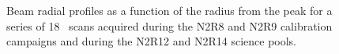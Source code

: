 \begin{figure}[!thbp]
  \caption[Stability of the beam profile]{Beam radial profiles as a
    function of the radius from the peak for a series of 18
    \bm\ scans acquired during the N2R8 and N2R9 calibration campaigns and
    during the N2R12 and N2R14 science pools.}
  \label{fig:beam_prof}
\end{figure}



%



